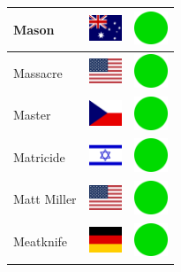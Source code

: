 \documentclass[12pt, a4paper, twoside]{report}
\begin{document}
\begin{center}
\begin{longtable}{|p{5cm}|p{2cm}|p{2cm}|}
 Mason                                                      & \includegraphics[width=1cm]{../4x3/au} &   \includegraphics[width=1cm]{../likes/y} \\ \hline
 Massacre                                                   & \includegraphics[width=1cm]{../4x3/us} &   \includegraphics[width=1cm]{../likes/y} \\ \hline
 Master                                                     & \includegraphics[width=1cm]{../4x3/cz} &   \includegraphics[width=1cm]{../likes/y} \\ \hline
 Matricide                                                  & \includegraphics[width=1cm]{../4x3/il} &   \includegraphics[width=1cm]{../likes/y} \\ \hline
 Matt Miller                                                & \includegraphics[width=1cm]{../4x3/us} &   \includegraphics[width=1cm]{../likes/y} \\ \hline
 Meatknife                                                  & \includegraphics[width=1cm]{../4x3/de} &   \includegraphics[width=1cm]{../likes/y} \\ \hline

\end{longtable}
\end{center}
\end{document}
